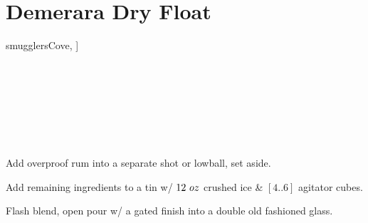 \section[Demerara Dry Float]{
    Demerara Dry Float~
}

\begin{recipestats}[
        servings=1,
        preptime=5~\minute,
        original=\citeauthor{beachbumBerryIntoxica}~\cite{beachbumBerryIntoxica},
        source=\citeauthor{smugglersCove}~\cite[p.~44]{smugglersCove},
    ]
\end{recipestats}

\begin{recipeabstract}
\end{recipeabstract}

\begin{ingredientcolumns}[1]
    \begin{ingredientblock}
        \\
        \\
        \\
        \\
        \\
        \\
    \end{ingredientblock}
\end{ingredientcolumns}

\begin{preparation}
\item Add overproof rum into a separate shot or lowball, set aside.
\item Add remaining ingredients to a tin w/ $12~oz$ crushed ice \&
    $[4..6]$ agitator cubes.
\item Flash blend, open pour w/ a gated finish into a double old fashioned glass.
\end{preparation}

\recipeend%
